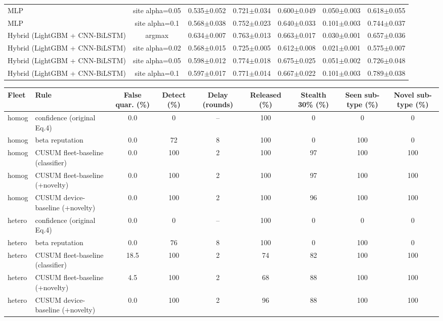 \begin{tabular}{lcccccc}
MLP & site alpha=0.05 & 0.535$\pm$0.052 & 0.721$\pm$0.034 & 0.600$\pm$0.049 & 0.050$\pm$0.003 & 0.618$\pm$0.055 \\
MLP & site alpha=0.1 & 0.568$\pm$0.038 & 0.752$\pm$0.023 & 0.640$\pm$0.033 & 0.101$\pm$0.003 & 0.744$\pm$0.037 \\
Hybrid (LightGBM + CNN-BiLSTM) & argmax & 0.634$\pm$0.007 & 0.763$\pm$0.013 & 0.663$\pm$0.017 & 0.030$\pm$0.001 & 0.657$\pm$0.036 \\
Hybrid (LightGBM + CNN-BiLSTM) & site alpha=0.02 & 0.568$\pm$0.015 & 0.725$\pm$0.005 & 0.612$\pm$0.008 & 0.021$\pm$0.001 & 0.575$\pm$0.007 \\
Hybrid (LightGBM + CNN-BiLSTM) & site alpha=0.05 & 0.598$\pm$0.012 & 0.774$\pm$0.018 & 0.675$\pm$0.025 & 0.051$\pm$0.002 & 0.726$\pm$0.048 \\
Hybrid (LightGBM + CNN-BiLSTM) & site alpha=0.1 & 0.597$\pm$0.017 & 0.771$\pm$0.014 & 0.667$\pm$0.022 & 0.101$\pm$0.003 & 0.789$\pm$0.038 \\
\bottomrule
\end{tabular}

\begin{tabular}{llccccccc}
\toprule
Fleet & Rule & False quar. (\%) & Detect (\%) & Delay (rounds) & Released (\%) & Stealth 30\% (\%) & Seen sub-type (\%) & Novel sub-type (\%) \\
\midrule
homog & confidence (original Eq.4) & 0.0 & 0 & -- & 100 & 0 & 0 & 0 \\
homog & beta reputation & 0.0 & 72 & 8 & 100 & 0 & 100 & 0 \\
homog & CUSUM fleet-baseline (classifier) & 0.0 & 100 & 2 & 100 & 97 & 100 & 100 \\
homog & CUSUM fleet-baseline (+novelty) & 0.0 & 100 & 2 & 100 & 97 & 100 & 100 \\
homog & CUSUM device-baseline (+novelty) & 0.0 & 100 & 2 & 100 & 96 & 100 & 100 \\
hetero & confidence (original Eq.4) & 0.0 & 0 & -- & 100 & 0 & 0 & 0 \\
hetero & beta reputation & 0.0 & 76 & 8 & 100 & 0 & 100 & 0 \\
hetero & CUSUM fleet-baseline (classifier) & 18.5 & 100 & 2 & 74 & 82 & 100 & 100 \\
hetero & CUSUM fleet-baseline (+novelty) & 4.5 & 100 & 2 & 68 & 88 & 100 & 100 \\
hetero & CUSUM device-baseline (+novelty) & 0.0 & 100 & 2 & 96 & 88 & 100 & 100 \\
\bottomrule
\end{tabular}

